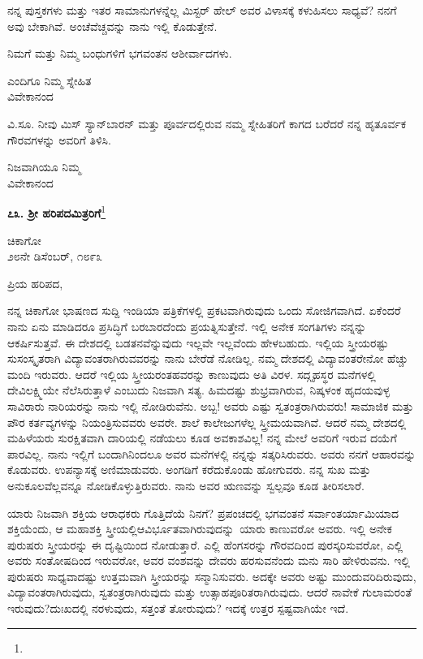 ನನ್ನ ಪುಸ್ತಕಗಳು ಮತ್ತು ಇತರ ಸಾಮಾನುಗಳನ್ನೆಲ್ಲ ಮಿಸ್ಟರ್ ಹೇಲ್ ಅವರ ವಿಳಾಸಕ್ಕೆ ಕಳುಹಿಸಲು ಸಾಧ್ಯವೆ? ನನಗೆ ಅವು ಬೇಕಾಗಿವೆ. ಅಂಚೆವೆಚ್ಚವನ್ನು ನಾನು ಇಲ್ಲಿ ಕೊಡುತ್ತೇನೆ.

ನಿಮಗೆ ಮತ್ತು ನಿಮ್ಮ ಬಂಧುಗಳಿಗೆ ಭಗವಂತನ ಆಶೀರ್ವಾದಗಳು.

\begin{flushright}
ಎಂದಿಗೂ ನಿಮ್ಮ ಸ್ನೇಹಿತ\\ವಿವೇಕಾನಂದ
\end{flushright}

ವಿ.ಸೂ. \enginline{-}ನೀವು ಮಿಸ್ ಸ್ಯಾನ್‌ಬಾರನ್ ಮತ್ತು ಪೂರ್ವದಲ್ಲಿರುವ ನಮ್ಮ ಸ್ನೇಹಿತರಿಗೆ ಕಾಗದ ಬರೆದರೆ ನನ್ನ ಹೃತೂರ್ವಕ ಗೌರವಗಳನ್ನು ಅವರಿಗೆ ತಿಳಿಸಿ.

{\flushright
ನಿಜವಾಗಿಯೂ ನಿಮ್ಮ\\ವಿವೇಕಾನಂದ\par}

\begin{center}
\textbf{೭೩. ಶ‍್ರೀ ಹರಿಪದಮಿತ್ರರಿಗೆ}\footnote{}
\end{center}

\begin{flushright}
ಚಿಕಾಗೋ\\೨೮ನೇ ಡಿಸೆಂಬರ್, ೧೮೯೩
\end{flushright}

\noindent
ಪ್ರಿಯ ಹರಿಪದ,

ನನ್ನ ಚಿಕಾಗೋ ಭಾಷಣದ ಸುದ್ದಿ ಇಂಡಿಯಾ ಪತ್ರಿಕೆಗಳಲ್ಲಿ ಪ್ರಕಟವಾಗಿರುವುದು ಒಂದು ಸೋಜಿಗವಾಗಿದೆ. ಏಕೆಂದರೆ ನಾನು ಏನು ಮಾಡಿದರೂ ಪ್ರಸಿದ್ಧಿಗೆ ಬರಬಾರದೆಂದು ಪ್ರಯತ್ನಿಸುತ್ತೇನೆ. ಇಲ್ಲಿ ಅನೇಕ ಸಂಗತಿಗಳು ನನ್ನನ್ನು ಆಕರ್ಷಿಸುತ್ತವೆ. ಈ ದೇಶದಲ್ಲಿ ಬಡತನವೆನ್ನುವುದು ಇಲ್ಲವೇ ಇಲ್ಲವೆಂದು ಹೇಳಬಹುದು. ಇಲ್ಲಿಯ ಸ್ತ್ರೀಯರಷ್ಟು ಸುಸಂಸ್ಕೃತರಾಗಿ ವಿದ್ಯಾವಂತರಾಗಿರುವವರನ್ನು ನಾನು ಬೇರೆಡೆ ನೋಡಿಲ್ಲ. ನಮ್ಮ ದೇಶದಲ್ಲಿ ವಿದ್ಯಾವಂತರೇನೋ ಹೆಚ್ಚು ಮಂದಿ ಇರುವರು. ಆದರೆ ಇಲ್ಲಿಯ ಸ್ತ್ರೀಯರಂತಹವರನ್ನು ಕಾಣುವುದು ಅತಿ ವಿರಳ. ಸದ್ಗೃಹಸ್ಥರ ಮನೆಗಳಲ್ಲಿ ದೇವಿಲಕ್ಷ್ಮಿಯೇ ನೆಲೆಸಿರುತ್ತಾಳೆ ಎಂಬುದು ನಿಜವಾಗಿ ಸತ್ಯ. ಹಿಮದಷ್ಟು ಶುಭ್ರವಾಗಿರುವ, ನಿಷ್ಕಳಂಕ ಹೃದಯವುಳ್ಳ ಸಾವಿರಾರು ನಾರಿಯರನ್ನು ನಾನು ಇಲ್ಲಿ ನೋಡಿರುವೆನು. ಅಬ್ಬ! ಅವರು ಎಷ್ಟು ಸ್ವತಂತ್ರರಾಗಿರುವರು! ಸಾಮಾಜಿಕ ಮತ್ತು ಪೌರ ಕರ್ತವ್ಯಗಳನ್ನು ನಿಯಂತ್ರಿಸುವವರು ಅವರೇ. ಶಾಲೆ ಕಾಲೇಜುಗಳೆಲ್ಲ ಸ್ತ್ರೀಮಯವಾಗಿವೆ. ಆದರೆ ನಮ್ಮ ದೇಶದಲ್ಲಿ ಮಹಿಳೆಯರು ಸುರಕ್ಷಿತವಾಗಿ ದಾರಿಯಲ್ಲಿ ನಡೆಯಲು ಕೂಡ ಅವಕಾಶವಿಲ್ಲ! ನನ್ನ ಮೇಲೆ ಅವರಿಗೆ ಇರುವ ದಯೆಗೆ ಪಾರವಿಲ್ಲ. ನಾನು ಇಲ್ಲಿಗೆ ಬಂದಾಗಿನಿಂದಲೂ ಅವರ ಮನೆಗಳಲ್ಲಿ ನನ್ನನ್ನು ಸತ್ಕರಿಸಿರುವರು. ಅವರು ನನಗೆ ಆಹಾರವನ್ನು ಕೊಡುವರು. ಉಪನ್ಯಾಸಕ್ಕೆ ಅಣಿಮಾಡುವರು. ಅಂಗಡಿಗೆ ಕರೆದುಕೊಂಡು ಹೋಗುವರು. ನನ್ನ ಸುಖ ಮತ್ತು ಅನುಕೂಲವೆಲ್ಲವನ್ನೂ ನೋಡಿಕೊಳ್ಳುತ್ತಿರುವರು. ನಾನು ಅವರ ಋಣವನ್ನು ಸ್ವಲ್ಪವೂ ಕೂಡ ತೀರಿಸಲಾರೆ.

ಯಾರು ನಿಜವಾಗಿ ಶಕ್ತಿಯ ಆರಾಧಕರು ಗೊತ್ತಿದೆಯೆ ನಿನಗೆ? ಪ್ರಪಂಚದಲ್ಲಿ ಭಗವಂತನೆ ಸರ್ವಾಂತರ್ಯಾಮಿಯಾದ ಶಕ್ತಿಯೆಂದು, ಆ ಮಹಾಶಕ್ತಿ ಸ್ತ್ರೀಯಲ್ಲಿ\break  \hbox{ಆವಿರ್ಭೂತವಾಗಿರುವುದನ್ನು ಯಾರು} ಕಾಣುವರೋ ಅವರು. ಇಲ್ಲಿ ಅನೇಕ ಪುರುಷರು ಸ್ತ್ರೀಯರನ್ನು ಈ ದೃಷ್ಟಿಯಿಂದ ನೋಡುತ್ತಾರೆ. ಎಲ್ಲಿ ಹೆಂಗಸರನ್ನು ಗೌರವದಿಂದ ಪುರಸ್ಕರಿಸುವರೋ, ಎಲ್ಲಿ ಅವರು ಸಂತೋಷದಿಂದ ಇರುವರೋ, ಅವರ ವಂಶವನ್ನು ದೇವರು ಹರಸುವನೆಂದು ಮನು ಸಾರಿ ಹೇಳಿರುವನು. ಇಲ್ಲಿ ಪುರುಷರು ಸಾಧ್ಯವಾದಷ್ಟು ಉತ್ತಮವಾಗಿ ಸ್ತ್ರೀಯರನ್ನು ಸನ್ಮಾನಿಸುವರು. ಅದಕ್ಕೇ ಅವರು ಅಷ್ಟು ಮುಂದುವರಿದಿರುವುದು, ವಿದ್ಯಾವಂತರಾಗಿರುವುದು, ಸ್ವತಂತ್ರರಾಗಿರುವುದು ಮತ್ತು ಉತ್ಸಾಹಪೂರಿತರಾಗಿರುವುದು. ಆದರೆ ನಾವೇಕೆ ಗುಲಾಮರಂತೆ ಇರುವುದು?ದುಃಖದಲ್ಲಿ ನರಳುವುದು, ಸತ್ತಂತೆ ತೋರುವುದು? ಇದಕ್ಕೆ ಉತ್ತರ ಸ್ಪಷ್ಟವಾಗಿಯೇ ಇದೆ.


